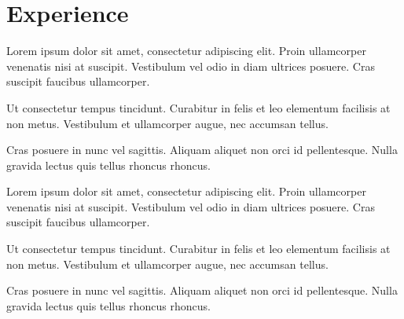 \documentclass[]{plushcv}
\begin{document}
    \begin{minipage}[t]{0.70\textwidth}



        \section{Experience}


        \vspace{\topsep} %
        \begin{tightemize}
            \sectionsep
            \item Lorem ipsum dolor sit amet, consectetur adipiscing elit. Proin ullamcorper venenatis nisi at suscipit. Vestibulum vel odio in diam ultrices posuere. Cras suscipit faucibus ullamcorper.
            \item Ut consectetur tempus tincidunt. Curabitur in felis et leo elementum facilisis at non metus. Vestibulum et ullamcorper augue, nec accumsan tellus. \item Cras posuere in nunc vel sagittis. Aliquam aliquet non orci id pellentesque. Nulla gravida lectus quis tellus rhoncus rhoncus.
        \end{tightemize}
        \sectionsep


        \begin{tightemize}
            \sectionsep
            \item Lorem ipsum dolor sit amet, consectetur adipiscing elit. Proin ullamcorper venenatis nisi at suscipit. Vestibulum vel odio in diam ultrices posuere. Cras suscipit faucibus ullamcorper.
            \item Ut consectetur tempus tincidunt. Curabitur in felis et leo elementum facilisis at non metus. Vestibulum et ullamcorper augue, nec accumsan tellus.
            \item Cras posuere in nunc vel sagittis. Aliquam aliquet non orci id pellentesque. Nulla gravida lectus quis tellus rhoncus rhoncus.
        \end{tightemize}
        \sectionsep



\end{minipage}
\end{document}
